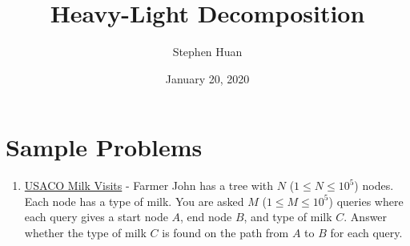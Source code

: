 \documentclass[11pt, oneside]{article}
\title{Heavy-Light Decomposition}
\author{Stephen Huan}
\date{January 20, 2020}
\begin{document}
\maketitle

\section{Sample Problems}

\begin{enumerate}
  \item \href{http://usaco.org/index.php?page=viewproblem2&cpid=970}{USACO Milk Visits} - Farmer John has a tree with \( N \) (\(1 \leq N \leq 10^5 \)) nodes.
  Each node has a type of milk. You are asked \( M \) (\(1 \leq M \leq 10^5 \)) queries where each query gives a start node \( A \), end node \( B \), and type of milk \( C \).
  Answer whether the type of milk \( C \) is found on the path from \( A \) to \( B \) for each query.


\end{enumerate}
\end{document}
